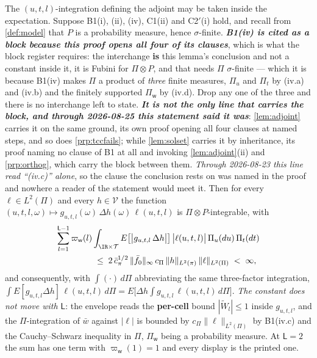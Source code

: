 \begin{lemma}\label{lem:adjfubini}
The $(u,t,l)$-integration defining the adjoint may be taken inside the expectation.
Suppose B1(i), (ii), (iv), C1(ii) and C2$'$(i) hold, and recall from \cref{def:model} that $P$ is a
probability measure, hence $\sigma$-finite. \emph{\textbf{B1(iv) is cited as a block because this proof
opens all four of its clauses}}, which is what the block register requires: the interchange \textbf{is} this lemma's
conclusion and not a constant inside it,
it is Fubini for $\Pi\otimes P$, and that needs $\Pi$ $\sigma$-finite --- which it is because B1(iv)
makes $\Pi$ a product of \emph{three} finite measures, $\Pi_u$ and $\Pi_t$ by \textup{(iv.a)} and
\textup{(iv.b)} and the finitely supported $\Pi_{\mathsf w}$ by \textup{(iv.d)}. Drop any one of the
three and there is no interchange left to state. \emph{\textbf{It is not the only line that carries the
block, and through 2026-08-25 this statement said it was}}: \cref{lem:adjoint} carries it on the same
ground, its own proof opening all four clauses at named steps, and so does \cref{prp:tccfails}; while
\cref{lem:solset} carries it by inheritance, its proof naming no clause of B1 at all and invoking
\cref{lem:adjoint}\textup{(ii)} and \cref{prp:orthog}, which carry the block between them.
\emph{Through 2026-08-23 this line read
``\textup{(iv.c)}'' alone}, so the clause the conclusion rests on was named in the proof and nowhere a
reader of the statement would meet it. Then for every $\ell\in L^{2}(\Pi)$ and every
$h\in\mathcal V$ the function
$(u,t,l,\omega)\mapsto g_{u,t,l}(\omega)\,\Delta h(\omega)\,\ell(u,t,l)$ is $\Pi\otimes P$-integrable, with
\begin{equation}\label{eq:adjenv}
\begin{split}
\sum_{l=1}^{\mathsf L-1}\varpi_{\mathsf w}(l)&\int_{\IR\times\mathcal T}
E\big[\big|g_{u,t,l}\,\Delta h\big|\big]\,\big|\ell(u,t,l)\big|\,\Pi_u(du)\,\Pi_t(dt)\\
&\;\le\;2\,\bar c_\pi^{1/2}\,\|\bar f_0\|_\infty\,c_\Pi\,\|h\|_{L^{2}(\pi)}\,\|\ell\|_{L^{2}(\Pi)}
\;<\;\infty,
\end{split}
\end{equation}
and consequently, with $\int(\cdot)\,d\Pi$ abbreviating the same three-factor integration,
$\int E[g_{u,t,l}\Delta h]\,\ell(u,t,l)\,d\Pi
=E\big[\Delta h\int g_{u,t,l}\,\ell(u,t,l)\,d\Pi\big]$.
\emph{The constant does not move with $\mathsf L$}: the envelope reads the \textbf{per-cell} bound
$|\widetilde W_l|\le1$ inside $g_{u,t,l}$, and the $\Pi$-integration of $\bar w$ against $|\ell|$ is
bounded by $c_\Pi\|\ell\|_{L^{2}(\Pi)}$ by B1(iv.c) and the Cauchy--Schwarz inequality in $\Pi$,
$\Pi_{\mathsf w}$ being a probability measure. At $\mathsf L=2$ the sum has one term with
$\varpi_{\mathsf w}(1)=1$ and every display is the printed one.
\end{lemma}

